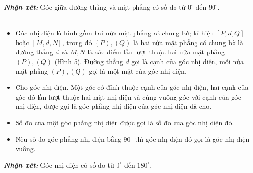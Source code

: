 \documentclass[12pt]{article}
\begin{document}
\noindent\textbf{\textit{Nhận xét:}} Góc giữa đường thẳng và mặt phẳng có số đo từ $0^\circ$ đến $90^\circ$.\\

\noindent\textbf{\color{myblue}{3. Góc nhị diện}}\\
\begin{minipage}{0.55\textwidth}
\begin{itemize}
    \item Góc nhị diện là hình gồm hai nửa mặt phẳng có chung bờ; kí hiệu $[P, d, Q]$ hoặc $[M, d, N]$, trong đó $(P), (Q)$ là hai nửa mặt phẳng có chung bờ là đường thẳng $d$ và $M, N$ là các điểm lần lượt thuộc hai nửa mặt phẳng $(P), (Q)$ (Hình 5). Đường thẳng $d$ gọi là cạnh của góc nhị diện, mỗi nửa mặt phẳng $(P), (Q)$ gọi là một mặt của góc nhị diện.
    \item Cho góc nhị diện. Một góc có đỉnh thuộc cạnh của góc nhị diện, hai cạnh của góc đó lần lượt thuộc hai mặt nhị diện và cùng vuông góc với cạnh của góc nhị diện, được gọi là góc phẳng nhị diện của góc nhị diện đã cho.
    \item Số đo của một góc phẳng nhị diện được gọi là số đo của góc nhị diện đó.
    \item Nếu số đo góc phẳng nhị diện bằng $90^\circ$ thì góc nhị diện đó gọi là góc nhị diện vuông.
\end{itemize}
\textbf{\textit{Nhận xét:}} Góc nhị diện có số đo từ $0^\circ$ đến $180^\circ$.
\end{minipage}
\hfill
\end{document}
